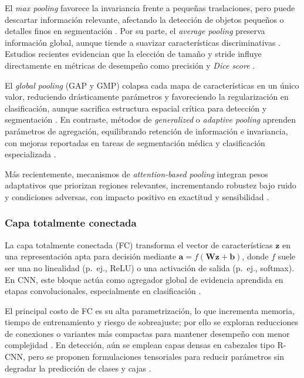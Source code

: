 El \textit{max pooling} favorece la invariancia frente a pequeñas traslaciones, pero puede descartar información relevante, afectando la detección de objetos pequeños o detalles finos en segmentación \parencite{Nirthika2022,Hao2021}. Por su parte, el \textit{average pooling} preserva información global, aunque tiende a suavizar características discriminativas \parencite{Nirthika2022}. Estudios recientes evidencian que la elección de tamaño y stride influye directamente en métricas de desempeño como precisión y \textit{Dice score} \parencite{Shadoul2025}.

El \textit{global pooling} (GAP y GMP) colapsa cada mapa de características en un único valor, reduciendo drásticamente parámetros y favoreciendo la regularización en clasificación, aunque sacrifica estructura espacial crítica para detección y segmentación \parencite{Nirthika2022}. En contraste, métodos de \textit{generalized} o \textit{adaptive pooling} aprenden parámetros de agregación, equilibrando retención de información e invariancia, con mejoras reportadas en tareas de segmentación médica y clasificación especializada \parencite{Hao2021,Kozlova2024}.

Más recientemente, mecanismos de \textit{attention-based pooling} integran pesos adaptativos que priorizan regiones relevantes, incrementando robustez bajo ruido y condiciones adversas, con impacto positivo en exactitud y sensibilidad \parencite{Chung2020,Zhong2023}. 

\subsubsection{Capa totalmente conectada}

La capa totalmente conectada (FC) transforma el vector de características $\mathbf{z}$ en una representación apta para decisión mediante $\mathbf{a}=f(\mathbf{Wz}+\mathbf{b})$, donde $f$ suele ser una no linealidad (p.\ ej., ReLU) o una activación de salida (p.\ ej., softmax). En CNN, este bloque actúa como agregador global de evidencia aprendida en etapas convolucionales, especialmente en clasificación \parencite{Saleem2022,Mahmoudi2020}.

El principal costo de FC es su alta parametrización, lo que incrementa memoria, tiempo de entrenamiento y riesgo de sobreajuste; por ello se exploran reducciones de conexiones o variantes más compactas para mantener desempeño con menor complejidad \parencite{Ju2022,Saleem2022}. En detección, aún se emplean capas densas en cabezales tipo R-CNN, pero se proponen formulaciones tensoriales para reducir parámetros sin degradar la predicción de clases y cajas \parencite{ElIchi2025}.

